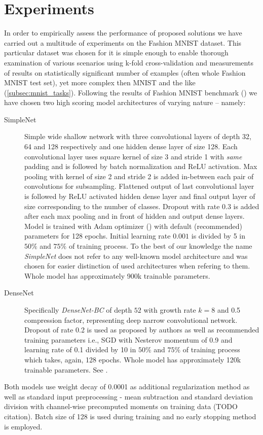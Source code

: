 \chapter{Experiments}

In order to empirically assess the performance of proposed solutions we have carried out a multitude of experiments on the Fashion MNIST dataset. This particular dataset was chosen for it is simple enough to enable thorough examination of various scenarios using k-fold cross-validation and measurements of results on statistically significant number of examples (often whole Fashion MNIST test set), yet more complex then MNIST and the like (\ref{subsec:mnist_tasks}). Following the results of Fashion MNIST benchmark (\cite{FASHION_BENCH}) we have chosen two high scoring model architectures of varying nature -- namely:

\begin{description}
    \item[SimpleNet]
Simple wide shallow network with three convolutional layers of depth 32, 64 and 128 respectively and one hidden dense layer of size 128. Each convolutional layer uses square kernel of size 3 and stride 1 with \textit{same} padding and is followed by batch normalization and ReLU activation. Max pooling with kernel of size 2 and stride 2 is added in-between each pair of convolutions for subsampling. Flattened output of last convolutional layer is followed by ReLU activated hidden dense layer and final output layer of size corresponding to the number of classes. Dropout with rate $0.3$ is added after each max pooling and in front of hidden and output dense layers. Model is trained with Adam optimizer (\cite{DBLP:journals/corr/KingmaB14}) with default (recommended) parameters for 128 epochs. Initial learning rate $0.001$ is divided by 5 in $50\%$ and $75\%$ of training process. To the best of our knowledge the name \textit{SimpleNet} does not refer to any well-known model architecture and was chosen for easier distinction of used architectures when refering to them. Whole model has approximately 900k trainable parameters.
    \item[DenseNet]
Specifically \textit{DenseNet-BC} of depth $52$ with growth rate $k=8$ and 0.5 compression factor, representing deep narrow convolutional network. Dropout of rate 0.2 is used as proposed by authors as well as recommended training parameters i.e., SGD with Nesterov momentum of 0.9 and learning rate of 0.1 divided by 10 in $50\%$ and $75\%$ of training process which takes, again, 128 epochs. Whole model has approximately 120k trainable parameters. See \cite{DBLP:journals/corr/HuangLW16a}.
\end{description}
Both models use weight decay of 0.0001 as additional regularization method as well as standard input preprocessing - mean subtraction and standard deviation division with channel-wise precomputed moments on training data (TODO citation). Batch size of 128 is used during training and no early stopping method is employed.


